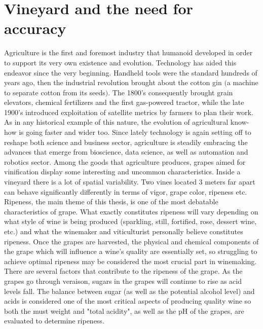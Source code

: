 \documentclass[12pt,a4paper,oneside]{book}
\theoremstyle{plain}
\theoremstyle{definition}
\begin{document}
{\chapter{Vineyard and the need for accuracy}
Agriculture is the first and foremost industry that humanoid developed in order to support its very own existence and evolution. Technology has aided this endeavor since the very beginning. Handheld tools were the standard hundreds of years ago, then the industrial revolution brought about the cotton gin $($a machine to separate cotton from its seeds$)$. The 1800's consequently brought grain elevators, chemical fertilizers and the first gas-powered tractor, while the late 1900's introduced exploitation of satellite metrics by farmers to plan their work. As in any historical example of this nature, the evolution of agricultural know-how is going faster and wider too. Since lately technology is again setting off to reshape both science and business sector, agriculture is steadily embracing the advances that emerge from bioscience, data science, as well as automation and robotics sector. 
\vspace{3mm}\newline
Among the goods that agriculture produces, grapes aimed for vinification display some interesting and uncommon characteristics. Inside a vineyard there is a lot of spatial variability.    
 Two vines located 3 meters far apart can behave significantly differently in terms of vigor, grape color, ripeness etc. Ripeness, the main theme of this thesis, is one of the most debatable characteristics of grape. What exactly constitutes ripeness will vary depending on what style of wine is being produced (sparkling, still, fortified, rose, dessert wine, etc.) and what the winemaker and viticulturist personally believe constitutes ripeness. Once the grapes are harvested, the physical and chemical components of the grape which will influence a wine's quality are essentially set, so struggling to achieve optimal ripeness may be considered the most crucial part in winemaking.
\vspace{3mm}\newline
There are several factors that contribute to the ripeness of the grape. As the grapes go through veraison, sugars in the grapes will continue to rise as acid levels fall. The balance between sugar (as well as the potential alcohol level) and acids is considered one of the most critical aspects of producing quality wine so both the must weight and "total acidity", as well as the pH of the grapes, are evaluated to determine ripeness. 
}
\end{document}
